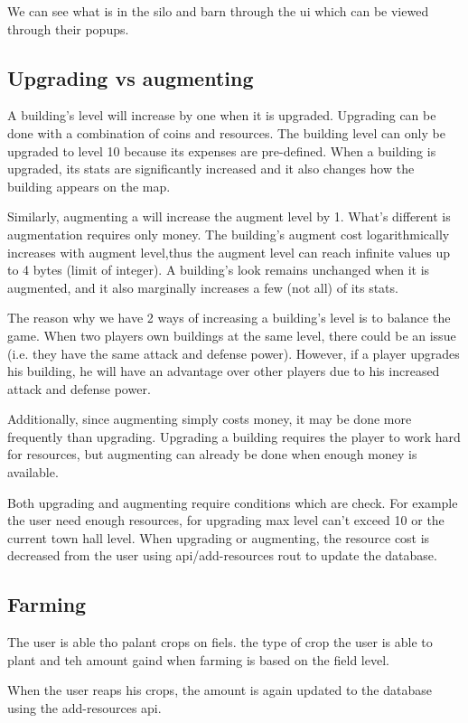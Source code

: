 \documentclass[12pt]{article}
\begin{document}
We can see what is in the silo and barn through the ui which can be viewed through their popups.
\subsection{Upgrading vs augmenting}
A building's level will increase by one when it is upgraded.
Upgrading can be done with a combination of coins and resources.
The building level can only be upgraded to level 10 because its expenses are pre-defined.
When a building is upgraded, its stats are significantly increased and it also changes how the building appears on the map.


Similarly, augmenting a will increase the augment level by 1.
What's different is augmentation requires only money.
The building's augment cost logarithmically increases with augment level,thus the augment level can reach infinite values up to 4 bytes (limit of integer).
A building's look remains unchanged when it is augmented, and it also marginally increases a few (not all) of its stats.

The reason why we have 2 ways of increasing a building's level is to balance the game.
When two players own buildings at the same level, there could be an issue (i.e. they have the same attack and defense power).
However, if a player upgrades his building, he will have an advantage over other players due to his increased attack and defense power.

Additionally, since augmenting simply costs money, it may be done more frequently than upgrading.
Upgrading a building requires the player to work hard for resources, but augmenting can already be done when enough money is available.

Both upgrading and augmenting require conditions which are check. For example the user need enough resources, for upgrading max level can't exceed 10 or the current town hall level. When upgrading or augmenting, the resource cost is decreased from the user using api/add-resources rout to update the database.

\subsection{Farming}

The user is able tho palant crops on fiels. the type of crop the user is able to plant and teh amount gaind when farming is based on the field level.

When the user reaps his crops, the amount is again updated to the database using the add-resources api.
\end{document}

